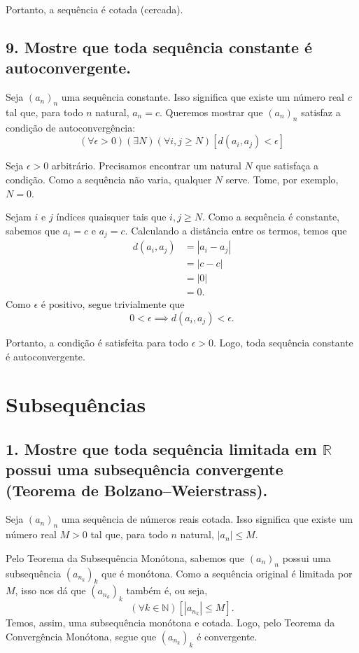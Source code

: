 \documentclass[12pt]{article}
\begin{document}
	Portanto, a sequência é cotada (cercada). \blacksquare
	
	\subsection*{9. Mostre que toda sequência constante é autoconvergente.}
	
	Seja $(a_n)_n$ uma sequência constante. Isso significa que existe um número real $c$ tal que, para todo $n$ natural, $a_n = c$. Queremos mostrar que $(a_n)_n$ satisfaz a condição de autoconvergência:
	\[
	(\forall \epsilon > 0)(\exists N)(\forall i, j \geq N)[d(a_i, a_j) < \epsilon]
	\]
	
	Seja $\epsilon > 0$ arbitrário. Precisamos encontrar um natural $N$ que satisfaça a condição. Como a sequência não varia, qualquer $N$ serve. Tome, por exemplo, $N = 0$.
	
	Sejam $i$ e $j$ índices quaisquer tais que $i, j \geq N$. Como a sequência é constante, sabemos que $a_i = c$ e $a_j = c$. Calculando a distância entre os termos, temos que
	\begin{align*}
		d(a_i, a_j)
		&= |a_i - a_j| \\
		&= |c - c| \\
		&= |0| \\
		&= 0.
	\end{align*}
	Como $\epsilon$ é positivo, segue trivialmente que
	\[
	0 < \epsilon \implies d(a_i, a_j) < \epsilon.
	\]
	
	Portanto, a condição é satisfeita para todo $\epsilon > 0$. Logo, toda sequência constante é autoconvergente. \blacksquare
	
	\section*{\centering Subsequências}
	
	\subsection*{1. Mostre que toda sequência limitada em $\mathbb{R}$ possui uma subsequência convergente (Teorema de Bolzano–Weierstrass).}
	
	Seja $(a_n)_n$ uma sequência de números reais cotada. Isso significa que existe um número real $M > 0$ tal que, para todo $n$ natural, $|a_n| \leq M$.
	
	Pelo Teorema da Subsequência Monótona, sabemos que $(a_n)_n$ possui uma subsequência $(a_{n_k})_k$ que é monótona. Como a sequência original é limitada por $M$, isso nos dá que $(a_{n_k})_k$ também é, ou seja,
	\[
	(\forall k \in \mathbb{N})[|a_{n_k}| \leq M].
	\]
	Temos, assim, uma subsequência monótona e cotada. Logo, pelo Teorema da Convergência Monótona, segue que $(a_{n_k})_k$ é convergente.
	
\end{document}

